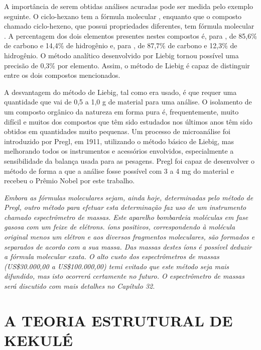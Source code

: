 A importância de serem obtidas análises acuradas pode ser medida pelo exemplo seguinte. O ciclo-hexano tem a fórmula molecular , enquanto que o composto chamado ciclo-hexeno, que possui propriedades diferentes, tem fórmula molecular . A percentagem dos dois elementos presentes nestes compostos é, para , de 85,6\% de carbono e 14,4\% de hidrogênio e, para , de 87,7\% de carbono e 12,3\% de hidrogênio. O método analítico desenvolvido por Liebig tornou possível uma precisão de 0,3\% por elemento. Assim, o método de Liebig é capaz de distinguir entre os dois compostos mencionados. 

A desvantagem do método de Liebig, tal como era usado, é que requer uma quantidade que vai de 0,5 a 1,0 g de material para uma análise. O isolamento de um composto orgânico da natureza em forma pura é, frequentemente, muito difícil e muitos dos compostos que têm sido estudados nos últimos anos têm sido obtidos em quantidades muito pequenas. Um processo de microanálise foi introduzido por Pregl, em 1911, utilizando o método básico de Liebig, mas melhorando todos os instrumentos e acessórios envolvidos, especialmente a sensibilidade da balança usada para as pesagens. Pregl foi capaz de desenvolver o método de forma a que a análise fosse possível com 3 a 4 mg do material e recebeu o Prêmio Nobel por este trabalho.

\par\bigskip
\noindent\emph{Embora as fórmulas moleculares sejam, ainda hoje, determinadas pelo método de Pregl, outro método para efetuar esta determinação faz uso de um instrumento chamado espectrômetro de massas. Este aparelho bombardeia moléculas em fase gasosa com um feixe de elétrons. íons positivos, correspondendo à molécula original menos um elétron e aos diversos fragmentos moleculares, são formados e separados de acordo com a sua massa. Das massas destes íons é possível deduzir a fórmula molecular exata. O alto custo dos espectrômetros de massas (US\$30.000,00 a US\$100.000,00) temi evitado que este método seja mais difundido, mas isto ocorrerá certamente no futuro. O espectrômetro de massas será discutido com mais detalhes no Capítulo 32.}
\par\bigskip

\section{A TEORIA ESTRUTURAL DE KEKULÉ}

